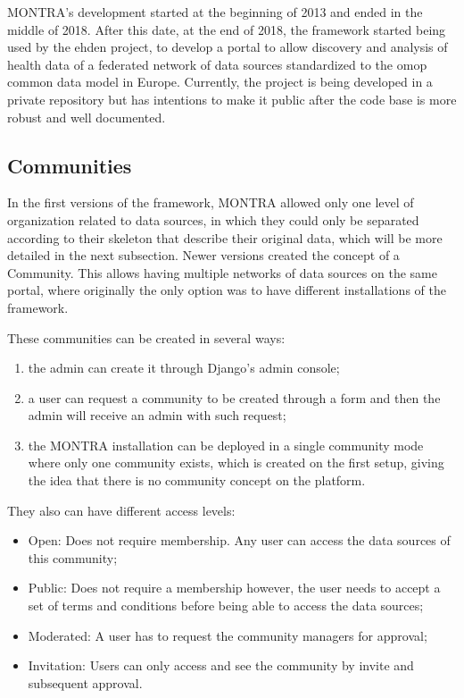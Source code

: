 MONTRA's development started at the beginning of 2013 and ended in the middle of 2018.
After this date, at the end of 2018, the framework started being used by the \gls{ehden} project, to develop a portal to allow discovery and analysis of health data of a federated network of data sources standardized to the \gls{omop} common data model in Europe.
Currently, the project is being developed in a private repository but has intentions to make it public after the code base is more robust and well documented.

\subsection{Communities}

In the first versions of the framework, MONTRA allowed only one level of organization related to data sources, in which they could only be separated according to their skeleton that describe their original data, which will be more detailed in the next subsection.
Newer versions created the concept of a Community.
This allows having multiple networks of data sources on the same portal, where originally the only option was to have different installations of the framework.

These communities can be created in several ways:

\begin{enumerate}
    \item the admin can create it through Django's admin console;
    \item a user can request a community to be created through a form and then the admin will receive an admin with such request;
    \item the MONTRA installation can be deployed in a single community mode where only one community exists, which is created on the first setup, giving the idea that there is no community concept on the platform.
\end{enumerate}

They also can have different access levels:

\begin{itemize}
    \item Open: Does not require membership. Any user can access the data sources of this community;
    \item Public: Does not require a membership however, the user needs to accept a set of terms and conditions before being able to access the data sources;
    \item Moderated: A user has to request the community managers for approval;
    \item Invitation: Users can only access and see the community by invite and subsequent approval.
\end{itemize}

